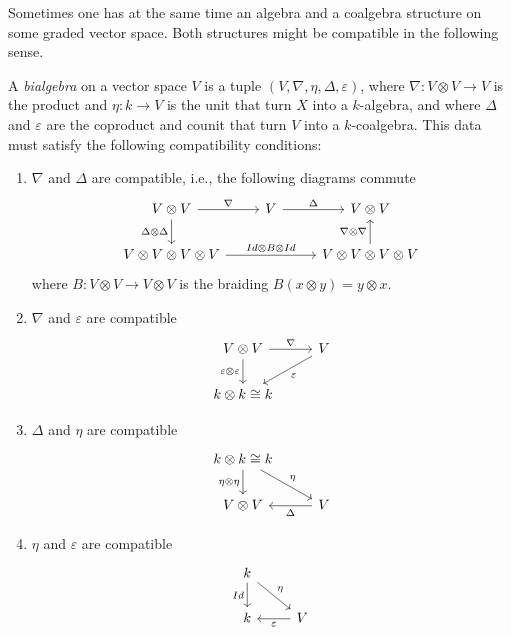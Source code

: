 \documentclass[TFM.tex]{subfiles}
\begin{document}
Sometimes one has at the same time an algebra and a coalgebra structure on some graded vector space. Both structures might be compatible in the following sense.

\begin{defi}
A \emph{bialgebra} on a vector space $V$ is a tuple $(V,\nabla,\eta, \Delta,\varepsilon)$, where $\nabla:V\otimes V\to V$ is the product and $\eta:k\to V$ is the unit that turn $X$ into a $k$-algebra, and where $\Delta$ and $\varepsilon$ are the coproduct and counit that turn $V$ into a $k$-coalgebra. This data must satisfy the following compatibility conditions:
\begin{enumerate}
\item $\nabla$ and $\Delta$ are compatible, i.e., the following diagrams commute
\[
\begin{tikzcd}
V\otimes V \arrow[r, "\nabla"] \arrow[d, "\Delta\otimes\Delta"'] & V \arrow[r, "\Delta"] & V\otimes V                                                    \\
V\otimes V\otimes V\otimes V \arrow[rr, "Id\otimes B\otimes Id"] &                       & V\otimes V\otimes V\otimes V \arrow[u, "\nabla\otimes\nabla"]
\end{tikzcd}
\]
where $B:V\otimes V\to V\otimes V$ is the braiding $B(x\otimes y)=y\otimes x$. 

\item $\nabla$ and $\varepsilon$ are compatible
\[
\begin{tikzcd}
V\otimes V \arrow[r, "\nabla"] \arrow[d, "\varepsilon\otimes\varepsilon"'] & V \arrow[ld, "\varepsilon"] \\
k\otimes k\cong k                                                          &                            
\end{tikzcd}
\]
\item $\Delta$ and $\eta$ are compatible
\[
\begin{tikzcd}
k\otimes k\cong k \arrow[d, "\eta\otimes\eta"'] \arrow[rd, "\eta"] &                       \\
V\otimes V                                                         & V \arrow[l, "\Delta"]
\end{tikzcd}
\]
\item $\eta$ and $\varepsilon$ are compatible
\[
\begin{tikzcd}
k \arrow[rd, "\eta"] \arrow[d, "Id"'] &                            \\
k                                     & V \arrow[l, "\varepsilon"]
\end{tikzcd}
\]
\end{enumerate}

\end{defi}
\end{document}
